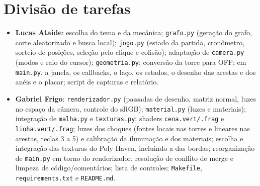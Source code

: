 \documentclass[a4paper,11pt]{article}
\newcommand{\arq}[1]{\texttt{#1}}
\begin{document}
\section{Divisão de tarefas}

\begin{itemize}
\item \textbf{Lucas Ataide}: escolha do tema e da mecânica; \arq{grafo.py}
  (geração do grafo, corte aleatorizado e busca local); \arq{jogo.py} (estado da
  partida, cronômetro, sorteio de posições, seleção pelo clique e colisão);
  adaptação de \arq{camera.py} (modos e raio do cursor); \arq{geometria.py};
  conversão da torre para OFF; em \arq{main.py}, a janela, os callbacks, o laço,
  os estados, o desenho das arestas e dos anéis e o placar; script de capturas e
  relatório.
\item \textbf{Gabriel Frigo}: \arq{renderizador.py} (passadas de desenho, matriz
  normal, luzes no espaço da câmera, controle do sRGB); \arq{material.py} (luzes e
  materiais); integração de \arq{malha.py} e \arq{texturas.py}; shaders
  \arq{cena.vert/.frag} e \arq{linha.vert/.frag}; luzes dos choques (fontes locais
  nas torres e lineares nas arestas, teclas 3 a 5) e calibração da iluminação e dos
  materiais; escolha e integração das texturas do Poly Haven, incluindo a das
  bordas; reorganização de \arq{main.py} em torno do renderizador, resolução de
  conflito de merge e limpeza de código/comentários; lista de controles;
  \arq{Makefile}, \arq{requirements.txt} e \arq{README.md}.
\end{itemize}

\end{document}
